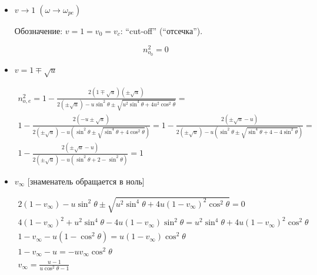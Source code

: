 \documentclass[10pt, a4paper]{article}
\begin{document}
\begin{itemize}
	\item $v\rightarrow 1\;(\omega\rightarrow\omega_{pe})$
	
	Обозначение: $v = 1 = v_0 = v_c$: ``cut-off'' (``отсечка'').
	
	\begin{equation*}
		n_{o_{0}}^2=0
	\end{equation*}
	
	\item $v=1\mp\sqrt{u}\;$
	
	\begin{multline*}
		n_{o,e}^2=1-\frac{2(1\mp\sqrt{u})(\pm\sqrt{u})}{2(\pm\sqrt{u})-u\sin^2\theta \pm \sqrt{u^2 \sin^4\theta+4u^2 \cos^2\theta}}=\\1-\frac{2(-u\pm\sqrt{u})}{2(\pm\sqrt{u})-u\left(\sin^2\theta\pm\sqrt{\sin^4\theta+4\cos^2\theta}\right)}= 1-\frac{2(\pm\sqrt{u}-u)} {2(\pm\sqrt{u})-u\left(\sin^2\theta\pm\sqrt{\sin^4\theta+4-4\sin^2\theta}\right)}=\\
		1-\frac{2(\pm\sqrt{u}-u)}{2(\pm\sqrt{u})-u\left(\sin^2\theta+2-\sin^2\theta\right)}=1
	\end{multline*}
	
	\item $v_\infty$ [знаменатель обращается в ноль]
	
	\begin{align*}
		2(1-v_\infty)-u\sin^2\theta \pm \sqrt{u^2 \sin^4\theta+4u(1-v_\infty)^2 \cos^2\theta}=0 \\
		4(1-v_\infty)^2+u^2\sin^4\theta-4u(1-v_\infty)\sin^2\theta = u^2 \sin^4\theta+4u(1-v_\infty)^2 \cos^2\theta \\
		1-v_\infty-u(1-\cos^2\theta) = u(1-v_\infty)\cos^2\theta \\
		1-v_\infty-u = -uv_\infty\cos^2\theta\\
		v_\infty = \frac{u-1}{u\cos^2\theta-1}
	\end{align*}

\end{itemize}
\end{document}
